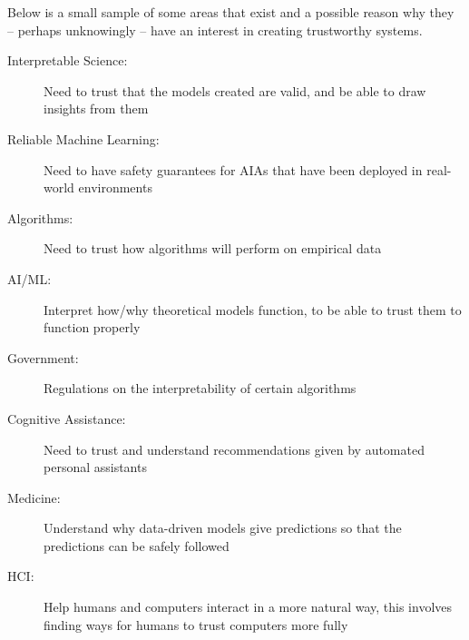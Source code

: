     Below is a small sample of some  %
    areas that exist and a possible reason why they -- perhaps unknowingly -- have an interest in creating trustworthy systems.
%
    \begin{description}
        \item [Interpretable Science:] Need to trust that the models created are valid, and be able to draw insights from them
        \item [Reliable Machine Learning:] Need to have safety guarantees for AIAs that have been deployed in real-world environments
        \item [Algorithms:] Need to trust how algorithms will perform on empirical data 
        \item [AI/ML:]  Interpret how/why theoretical models function, to be able to trust them to function properly 
        \item [Government:] Regulations on the interpretability of certain algorithms 
        \item [Cognitive Assistance:] Need to trust and understand recommendations given by automated personal assistants
        \item [Medicine:] Understand why data-driven models give predictions so that the predictions can be safely followed
        \item [HCI:] Help humans and computers interact in a more natural way, this involves finding ways for humans to trust computers more fully  
    \end{description}

